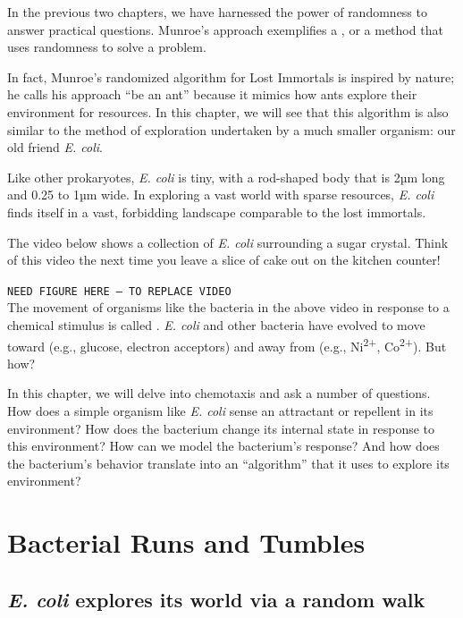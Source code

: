 In the previous two chapters, we have harnessed the power of randomness to answer practical questions. Munroe's approach exemplifies a , or a method that uses randomness to solve a problem.

In fact, Munroe's randomized algorithm for Lost Immortals is inspired by nature; he calls his approach ``be an ant'' because it mimics how ants explore their environment for resources. In this chapter, we will see that this algorithm is also similar to the method of exploration undertaken by a much smaller organism: our old friend \textit{E. coli}.

Like other prokaryotes, \textit{E. coli} is tiny, with a rod-shaped body that is 2µm long and 0.25 to 1µm wide. In exploring a vast world with sparse resources, \textit{E. coli} finds itself in a vast, forbidding landscape comparable to the lost immortals.

The video below shows a collection of \textit{E. coli} surrounding a sugar crystal. Think of this video the next time you leave a slice of cake out on the kitchen counter!

\texttt{NEED FIGURE HERE -- TO REPLACE VIDEO}\\

The movement of organisms like the bacteria in the above video in response to a chemical stimulus is called . \textit{E. coli} and other bacteria have evolved to move toward  (e.g., glucose, electron acceptors) and away from  (e.g., Ni\textsuperscript{2+}, Co\textsuperscript{2+}). But how?

In this chapter, we will delve into chemotaxis and ask a number of questions. How does a simple organism like \textit{E. coli} sense an attractant or repellent in its environment? How does the bacterium change its internal state in response to this environment? How can we model the bacterium's response? And how does the bacterium's behavior translate into an ``algorithm'' that it uses to explore its environment?

\FloatBarrier
{}
\section{Bacterial Runs and Tumbles}
\label{sec:bacterial_runs_and_tumbles}

\subsection{\textit{E. coli} explores its world via a random walk}


